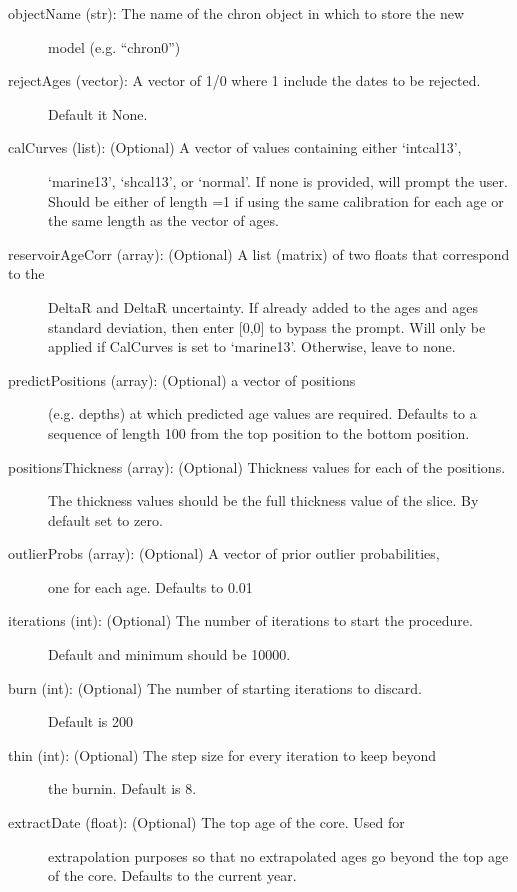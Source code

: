 \documentclass[letterpaper,10pt,english]{sphinxmanual}
\begin{document}
\begin{fulllineitems}
\begin{description}
\begin{description}
\item[{objectName (str): The name of the chron object in which to store the new}] \leavevmode
model (e.g. “chron0”)

\item[{rejectAges (vector): A vector of 1/0 where 1 include the dates to be rejected.}] \leavevmode
Default it None.

\item[{calCurves (list): (Optional) A vector of values containing either ‘intcal13’,}] \leavevmode
‘marine13’, ‘shcal13’, or ‘normal’. If none is provided, will
prompt the user. Should be either of length =1 if using the same
calibration for each age or the same length as the vector of ages.

\item[{reservoirAgeCorr (array): (Optional) A list (matrix) of two floats that correspond to the}] \leavevmode
DeltaR and DeltaR uncertainty. If already added to the ages and
ages standard deviation, then enter {[}0,0{]} to bypass the prompt.
Will only be applied if CalCurves is set to ‘marine13’. Otherwise,
leave to none.

\item[{predictPositions (array): (Optional) a vector of positions}] \leavevmode
(e.g. depths) at which predicted age values are required.
Defaults to a sequence of length 100 from the top position to the
bottom position.

\item[{positionsThickness (array): (Optional) Thickness values for each of the positions.}] \leavevmode
The thickness values should be the full thickness value of the
slice. By default set to zero.

\item[{outlierProbs (array): (Optional) A vector of prior outlier probabilities,}] \leavevmode
one for each age. Defaults to 0.01

\item[{iterations (int): (Optional) The number of iterations to start the procedure.}] \leavevmode
Default and minimum should be 10000.

\item[{burn (int): (Optional) The number of starting iterations to discard.}] \leavevmode
Default is 200

\item[{thin (int): (Optional) The step size for every iteration to keep beyond}] \leavevmode
the burnin. Default is 8.

\item[{extractDate (float): (Optional) The top age of the core. Used for}] \leavevmode
extrapolation purposes so that no extrapolated ages go beyond the
top age of the core. Defaults to the current year.


\end{description}
\end{description}
\end{fulllineitems}
\end{document}
